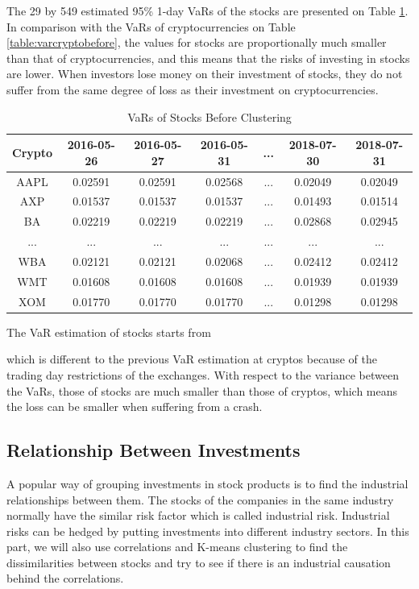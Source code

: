 \documentclass[11pt]{article} %
\theoremstyle{plain}
\theoremstyle{definition}
\begin{document}
The 29 by 549 estimated 95\% 1-day VaRs of the stocks are presented on Table \ref{table:varstockbefore}. In comparison with the VaRs of cryptocurrencies on Table \ref{table:varcryptobefore}, the values for stocks are proportionally much smaller than that of cryptocurrencies, and this means that the risks of investing in stocks are lower. When investors lose money on their investment of stocks, they do not suffer from the same degree of loss as their investment on cryptocurrencies.

{
  \begin{table}[ht]
    \centering
    \small
    \begin{tabular}{|c|c c c c c c|}
        \hline
        Crypto & 2016-05-26 & 2016-05-27 & 2016-05-31 & ... & 2018-07-30 & 2018-07-31 \\ [0.5ex]
        \hline
        AAPL & 0.02591 & 0.02591 & 0.02568 & ... & 0.02049 & 0.02049 \\
        \hline
        AXP & 0.01537 & 0.01537 & 0.01537 & ... & 0.01493 & 0.01514 \\
        \hline
        BA & 0.02219 & 0.02219 & 0.02219 & ... & 0.02868 & 0.02945 \\
        \hline
        ... & ... & ... & ... & ... & ... & ... \\
        \hline
        WBA & 0.02121 & 0.02121 & 0.02068 & ... & 0.02412 & 0.02412 \\
        \hline
        WMT & 0.01608 & 0.01608 & 0.01608 & ... & 0.01939 & 0.01939 \\
        \hline
        XOM & 0.01770 & 0.01770 & 0.01770 & ... & 0.01298 & 0.01298 \\
        \hline
    \end{tabular}
    \caption{VaRs of Stocks Before Clustering}
    \label{table:varstockbefore}
  \end{table}
}

The VaR estimation of stocks starts from \date{26th May 2016} which is different to the previous VaR estimation at cryptos because of the trading day restrictions of the exchanges. With respect to the variance between the VaRs, those of stocks are much smaller than those of cryptos, which means the loss can be smaller when suffering from a crash.

\subsection{Relationship Between Investments}

A popular way of grouping investments in stock products is to find the industrial relationships between them. The stocks of the companies in the same industry normally have the similar risk factor which is called industrial risk. Industrial risks can be hedged by putting investments into different industry sectors. In this part, we will also use correlations and K-means clustering to find the dissimilarities between stocks and try to see if there is an industrial causation behind the correlations.
\end{document}
